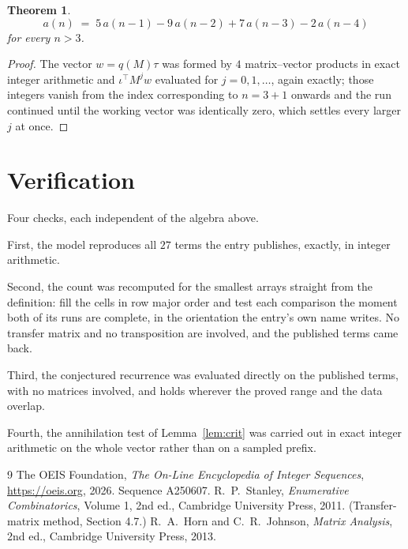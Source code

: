 \documentclass[11pt,a4paper]{article}
\theoremstyle{plain}
\newtheorem{theorem}{Theorem}
\theoremstyle{definition}
\begin{document}
\begin{theorem}
\[
a(n)\;=\;5\,a(n-1) - 9\,a(n-2) + 7\,a(n-3) - 2\,a(n-4)
\]
for every $n>3$.
\end{theorem}

\begin{proof}
The vector $w=q(M)\tau$ was formed by $4$ matrix--vector products in exact integer
arithmetic and $\iota^{\!\top}M^{j}w$ evaluated for $j=0,1,\dots$, again exactly; those
integers vanish from the index corresponding to $n=3+1$ onwards and the run continued
until the working vector was identically zero, which settles every larger $j$ at once.
\end{proof}

\section{Verification}

Four checks, each independent of the algebra above.

First, the model reproduces all $27$ terms the entry publishes, exactly, in integer
arithmetic.

Second, the count was recomputed for the smallest arrays straight from the definition: fill the
cells in row major order and test each comparison the moment both of its runs are complete,
in the orientation the entry's own name writes. No transfer matrix and no transposition are
involved, and the published terms came back.

Third, the conjectured recurrence was evaluated directly on the published terms, with no
matrices involved, and holds wherever the proved range and the data overlap.

Fourth, the annihilation test of Lemma~\ref{lem:crit} was carried out in exact integer
arithmetic on the whole vector rather than on a sampled prefix.

\begin{thebibliography}{9}
 The OEIS Foundation, \emph{The On-Line Encyclopedia of Integer
Sequences}, \url{https://oeis.org}, 2026. Sequence A250607.
 R.~P.~Stanley, \emph{Enumerative Combinatorics}, Volume 1, 2nd ed.,
Cambridge University Press, 2011. (Transfer-matrix method, Section 4.7.)
 R.~A.~Horn and C.~R.~Johnson, \emph{Matrix Analysis}, 2nd ed., Cambridge
University Press, 2013.
\end{thebibliography}
\end{document}
